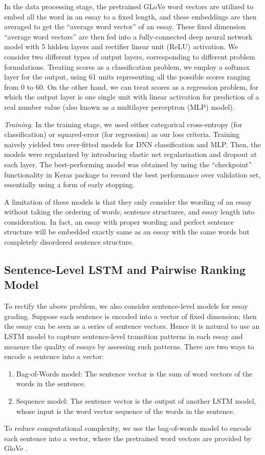 \documentclass[10pt,psamsfonts]{amsart}
\theoremstyle{definition}
\theoremstyle{remark}
\numberwithin{equation}{section}
\begin{document}
In the data processing stage, the pretrained GLoVe word vectors are utilized to embed all the word in an essay to a fixed length, and these embeddings are then averaged to get the ``average word vector'' of an essay. These fixed dimension ``average word vectors'' are then fed into a fully-connected deep neural network model with 5 hidden layers and rectifier linear unit (ReLU) activation. We consider two different types of output layers, corresponding to different problem formulations. Treating scores as a classification problem, we employ a softmax layer for the output, using 61 units representing all the possible scores ranging from 0 to 60. On the other hand, we can treat scores as a regression problem, for which the output layer is one single unit with linear activation for prediction of a real number value (also known as a multilayer perceptron (MLP) model).

{\em Training.} In the training stage, we used either categorical cross-entropy (for classification) or squared-error (for regression) as our loss criteria. Training naively yielded two over-fitted models for DNN classification and MLP. Then, the models were regularized by introducing elastic net regularization and dropout at each layer. The best-performing model was obtained by using the ``checkpoint'' functionality in Keras package to record the best performance over validation set, essentially using a form of early stopping.

A limitation of these models is that they only consider the wording of an essay without taking the ordering of words, sentence structures, and essay length into consideration. In fact, an essay with proper wording and perfect sentence structure will be embedded exactly same as an essay with the same words but completely disordered sentence structure. 

\subsection*{Sentence-Level LSTM and Pairwise Ranking Model}

To rectify the above problem, we also consider sentence-level models for essay grading. Suppose each sentence is encoded into a vector of fixed dimension; then the essay can be seen as a series of sentence vectors. Hence it is natural to use an LSTM model to capture sentence-level transition patterns in each essay and measure the quality of essays by assessing such patterns. There are two ways to encode a sentence into a vector:
\begin{enumerate}
\item Bag-of-Words model: The sentence vector is the sum of word vectors of the words in the sentence.
\item Sequence model: The sentence vector is the output of another LSTM model, whose input is the word vector sequence of the words in the sentence. 
\end{enumerate}
To reduce computational complexity, we use the bag-of-words model to encode each sentence into a vector, where the pretrained word vectors are provided by GloVe \cite{glove}.
\end{document}
